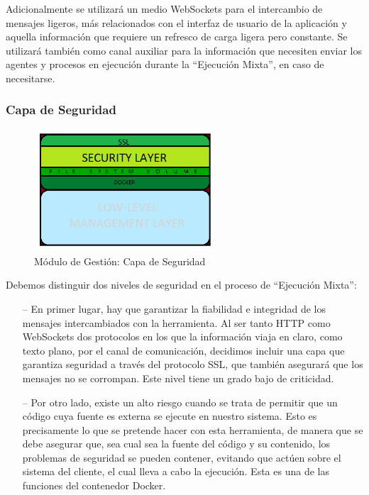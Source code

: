Adicionalmente se utilizará un medio WebSockets para el intercambio de mensajes ligeros, más relacionados con el interfaz de usuario de la aplicación y aquella información que requiere un refresco de carga ligera pero constante. Se utilizará también como canal auxiliar para la información que necesiten enviar los agentes y procesos en ejecución durante la ``Ejecución Mixta'', en caso de necesitarse.

\subsubsection{Capa de Seguridad}

\begin{figure}[!hbtp]  \centering\noindent
    \includegraphics[width=0.6\textwidth]{figures/layer2.png}
    \caption{Módulo de Gestión: Capa de Seguridad}
    \label{layer2}
\end{figure}

Debemos distinguir dos niveles de seguridad en el proceso de ``Ejecución Mixta'':

\begin{itemize}
    \item [--] En primer lugar, hay que garantizar la fiabilidad e integridad de los mensajes intercambiados con la herramienta. Al ser tanto HTTP como WebSockets dos protocolos en los que la información viaja en claro, como texto plano, por el canal de comunicación, decidimos incluir una capa que garantiza seguridad a través del protocolo SSL, que también asegurará que los mensajes no se corrompan. Este nivel tiene un grado bajo de criticidad.
    \item [--] Por otro lado, existe un alto riesgo cuando se trata de permitir que un código cuya fuente es externa se ejecute en nuestro sistema. Esto es precisamente lo que se pretende hacer con esta herramienta, de manera que se debe asegurar que, sea cual sea la fuente del código y su contenido, los problemas de seguridad se pueden contener, evitando que actúen sobre el sistema del cliente, el cual lleva a cabo la ejecución. Esta es una de las funciones del contenedor Docker.
\end{itemize}

